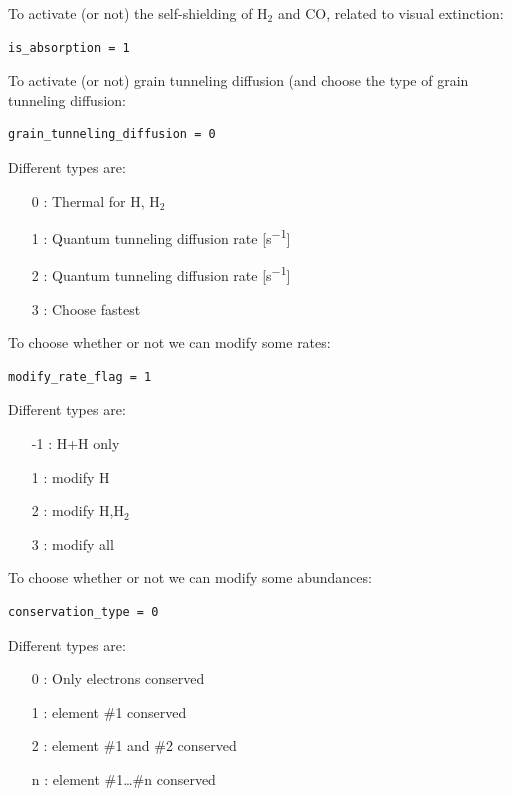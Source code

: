 \documentclass[english,a4paper,twoside]{article}
\newcommand{\molecule}[1]{\ensuremath{\mathrm{#1}}}
\begin{document}
To activate (or not) the self-shielding of $\molecule{H_2}$ and $\molecule{CO}$, related to visual extinction: 
\begin{verbatim}
is_absorption = 1
\end{verbatim}

To activate (or not) grain tunneling diffusion (and choose the type of grain tunneling diffusion: 
\begin{verbatim}
grain_tunneling_diffusion = 0
\end{verbatim}

Different types are:
\begin{itemize}
\item[0] : Thermal for H, \molecule{H_2}
\item[1] : Quantum tunneling diffusion rate [\unit{s^{-1}}] \citep{1976RvMP...48..513W}
\item[2] : Quantum tunneling diffusion rate [\unit{s^{-1}}] \citep{1992ApJS...82..167H}
\item[3] : Choose fastest
\end{itemize}

To choose whether or not we can modify some rates:
\begin{verbatim}
modify_rate_flag = 1
\end{verbatim}

Different types are:
\begin{itemize}
\item[-1] : H+H only
\item[1] : modify H
\item[2] : modify H,\molecule{H_2}
\item[3] : modify all
\end{itemize}

To choose whether or not we can modify some abundances:
\begin{verbatim}
conservation_type = 0
\end{verbatim}

Different types are:
\begin{itemize}
\item[0] : Only electrons conserved
\item[1] : element \#1 conserved
\item[2] : element \#1 and \#2 conserved
\item[n] : element \#1\dots\#n conserved
\end{itemize}
\end{document}
